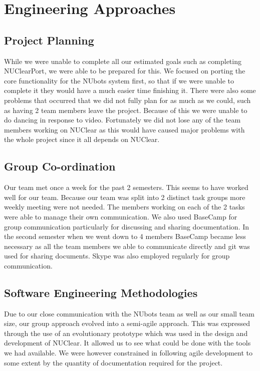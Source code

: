 \documentclass[english,12pt]{scrartcl}
\begin{document}
\section{Engineering Approaches}
	\subsection{Project Planning}
		While we were unable to complete all our estimated goals such as completing NUClearPort, we were able to be prepared for this.
		We focused on porting the core functionality for the NUbots system first, so that if we were unable to complete it they would have a much easier time finishing it.
		There were also some problems that occurred that we did not fully plan for as much as we could, such as having 2 team members leave the project.
		Because of this we were unable to do dancing in response to video.
		Fortunately we did not lose any of the team members working on NUClear as this would have caused major problems with the whole project since it all depends on NUClear.
	
	\subsection{Group Co-ordination}
		Our team met once a week for the past 2 semesters. This seems to have worked well for our team.
		Because our team was split into 2 distinct task groups more weekly meeting were not needed.
		The members working on each of the 2 tasks were able to manage their own communication.
		We also used BaseCamp for group communication particularly for discussing and sharing documentation.
		In the second semester when we went down to 4 members BaseCamp became less necessary as all the team members we able to communicate directly and git was used for sharing documents.
		Skype was also employed regularly for group communication.
	
	\subsection{Software Engineering Methodologies}
		Due to our close communication with the NUbots team as well as our small team size, our group approach evolved into a semi-agile approach. This was expressed through the use of an evolutionary prototype which was used in the design and development of NUClear. It allowed us to see what could be done with the tools we had available. We were however constrained in following agile development to some extent by the quantity of documentation required for the project.
		
\end{document}
